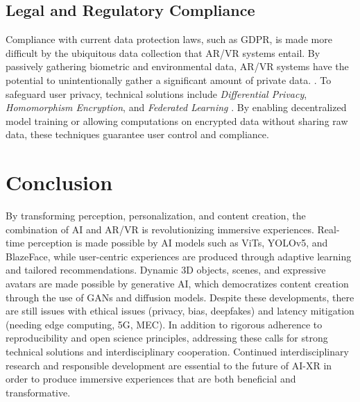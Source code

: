 \documentclass[conference]{IEEEtran}
\begin{document}
\subsection{Legal and Regulatory Compliance}
Compliance with current data protection laws, such as GDPR, is made more difficult by the ubiquitous data collection that AR/VR systems entail. By passively gathering biometric and environmental data, AR/VR systems have the potential to unintentionally gather a significant amount of private data. \cite{Johnson2024PrivacyReview}. To safeguard user privacy, technical solutions include \textit{Differential Privacy}, \textit{Homomorphism Encryption}, and \textit{Federated Learning} \cite{Johnson2024PrivacySurvey, Johnson2024PrivacyML}. By enabling decentralized model training or allowing computations on encrypted data without sharing raw data, these techniques guarantee user control and compliance.



\section{Conclusion}
By transforming perception, personalization, and content creation, the combination of AI and AR/VR is revolutionizing immersive experiences. Real-time perception is made possible by AI models such as ViTs, YOLOv5, and BlazeFace, while user-centric experiences are produced through adaptive learning and tailored recommendations. Dynamic 3D objects, scenes, and expressive avatars are made possible by generative AI, which democratizes content creation through the use of GANs and diffusion models. Despite these developments, there are still issues with ethical issues (privacy, bias, deepfakes) and latency mitigation (needing edge computing, 5G, MEC). In addition to rigorous adherence to reproducibility and open science principles, addressing these calls for strong technical solutions and interdisciplinary cooperation. Continued interdisciplinary research and responsible development are essential to the future of AI-XR in order to produce immersive experiences that are both beneficial and transformative.
\end{document}
